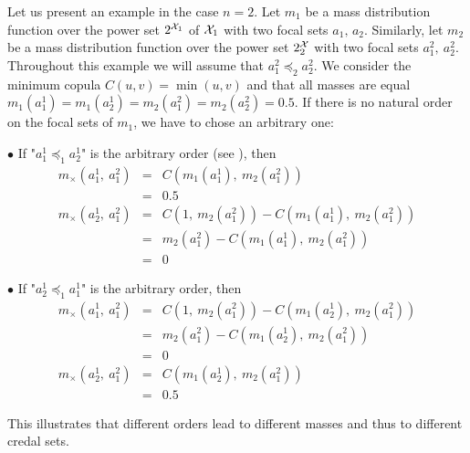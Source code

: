 \begin{example}\label{ex:joint_mass}
    Let us present an example in the case $n=2$. Let $m_1$ be a mass distribution function over the power set $2^{\mathcal{X}_1}$ of $\mathcal{X}_1$ with two focal sets $a_1,\, a_2$. Similarly, let $m_2$ be a mass distribution function over the power set $2^{\mathcal{X}}_2$ with two focal sets $a_1^2,~a_2^2$. Throughout this example we will assume that $a_1^2\preceq_2a_2^2$. We consider the minimum copula $C(u,v)=\min(u,v)$ and that all masses are equal $m_1(a_1^1)=m_1(a_2^1)=m_2(a_1^2)=m_2(a_2^2)=0.5$.
    If there is no natural order on the focal sets of $m_1$, we have to chose an arbitrary one:\par
    $\bullet$ If "$a_1^1\preceq_1a_2^1$" is the arbitrary order (see ), then
    \begin{eqnarray*}
        m_\times(a_1^1,~a_1^2) &=& C(m_1(a_1^1),~m_2(a_1^2))\\
        &=& 0.5\\
        m_\times(a_2^1,~a_1^2) &=& C(1,~m_2(a_1^2)) - C(m_1(a_1^1),~m_2(a_1^2))\\
        &=& m_2(a_1^2) - C(m_1(a_1^1),~m_2(a_1^2))\\
        &=& 0
    \end{eqnarray*}\par
    $\bullet$ If "$a_2^1\preceq_1a_1^1$" is the arbitrary order, then
    \begin{eqnarray*}
        m_\times(a_1^1,~a_1^2) &=& C(1,~m_2(a_1^2)) - C(m_1(a_2^1),~m_2(a_1^2))\\
        &=& m_2(a_1^2) - C(m_1(a_2^1),~m_2(a_1^2))\\
        &=& 0\\
        m_\times(a_2^1,~a_1^2) &=& C(m_1(a_2^1),~m_2(a_1^2))\\
        &=& 0.5
    \end{eqnarray*}
        
    This illustrates that different orders lead to different masses and thus to different credal sets.
    

\end{example}
